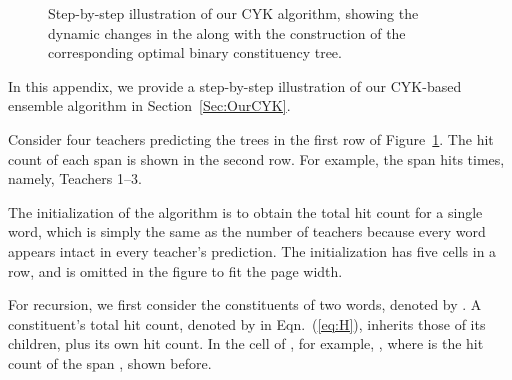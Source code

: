\documentclass{article}
\begin{document}
\begin{figure}[!b]
{
}
    \caption{Step-by-step illustration of our CYK algorithm, showing the dynamic changes in the  along with the construction of the corresponding optimal binary constituency tree.}
    \label{fig:illustration}
\end{figure}
In this appendix, we provide a step-by-step illustration of our CYK-based ensemble algorithm in Section~\ref{Sec:OurCYK}.

Consider four teachers predicting the trees in the first row of Figure~\ref{fig:illustration}. The hit count of each span is shown in the second row. For example, the span  hits  times, namely, Teachers 1--3. 

The initialization of the algorithm is to obtain the total hit count for a single word, which is simply the same as the number of teachers because every word appears intact in every teacher's prediction. The initialization has five cells in a row, and is omitted in the figure to fit the page width.

For recursion, we first consider the constituents of two words, denoted by . A constituent's total hit count, denoted by  in Eqn.~(\ref{eq:H}), inherits those of its children, plus its own hit count. In the cell of , for example, , where  is the hit count of the span , shown before. 
\end{document}
